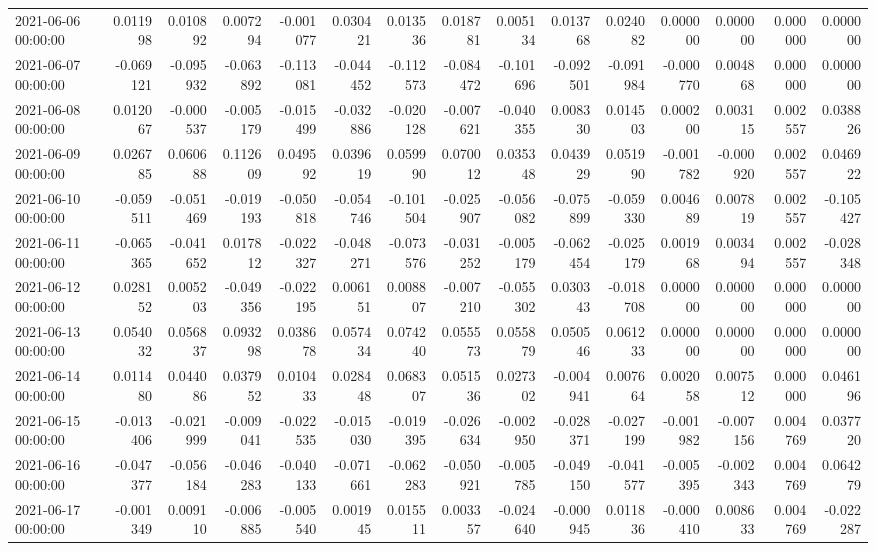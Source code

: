 \begin{tabular}{lrrrrrrrrrrrrrr}
2021-06-06 00:00:00 & 0.011998 & 0.010892 & 0.007294 & -0.001077 & 0.030421 & 0.013536 & 0.018781 & 0.005134 & 0.013768 & 0.024082 & 0.000000 & 0.000000 & 0.000000 & 0.000000 \\
2021-06-07 00:00:00 & -0.069121 & -0.095932 & -0.063892 & -0.113081 & -0.044452 & -0.112573 & -0.084472 & -0.101696 & -0.092501 & -0.091984 & -0.000770 & 0.004868 & 0.000000 & 0.000000 \\
2021-06-08 00:00:00 & 0.012067 & -0.000537 & -0.005179 & -0.015499 & -0.032886 & -0.020128 & -0.007621 & -0.040355 & 0.008330 & 0.014503 & 0.000200 & 0.003115 & 0.002557 & 0.038826 \\
2021-06-09 00:00:00 & 0.026785 & 0.060688 & 0.112609 & 0.049592 & 0.039619 & 0.059990 & 0.070012 & 0.035348 & 0.043929 & 0.051990 & -0.001782 & -0.000920 & 0.002557 & 0.046922 \\
2021-06-10 00:00:00 & -0.059511 & -0.051469 & -0.019193 & -0.050818 & -0.054746 & -0.101504 & -0.025907 & -0.056082 & -0.075899 & -0.059330 & 0.004689 & 0.007819 & 0.002557 & -0.105427 \\
2021-06-11 00:00:00 & -0.065365 & -0.041652 & 0.017812 & -0.022327 & -0.048271 & -0.073576 & -0.031252 & -0.005179 & -0.062454 & -0.025179 & 0.001968 & 0.003494 & 0.002557 & -0.028348 \\
2021-06-12 00:00:00 & 0.028152 & 0.005203 & -0.049356 & -0.022195 & 0.006151 & 0.008807 & -0.007210 & -0.055302 & 0.030343 & -0.018708 & 0.000000 & 0.000000 & 0.000000 & 0.000000 \\
2021-06-13 00:00:00 & 0.054032 & 0.056837 & 0.093298 & 0.038678 & 0.057434 & 0.074240 & 0.055573 & 0.055879 & 0.050546 & 0.061233 & 0.000000 & 0.000000 & 0.000000 & 0.000000 \\
2021-06-14 00:00:00 & 0.011480 & 0.044086 & 0.037952 & 0.010433 & 0.028448 & 0.068307 & 0.051536 & 0.027302 & -0.004941 & 0.007664 & 0.002058 & 0.007512 & 0.000000 & 0.046196 \\
2021-06-15 00:00:00 & -0.013406 & -0.021999 & -0.009041 & -0.022535 & -0.015030 & -0.019395 & -0.026634 & -0.002950 & -0.028371 & -0.027199 & -0.001982 & -0.007156 & 0.004769 & 0.037720 \\
2021-06-16 00:00:00 & -0.047377 & -0.056184 & -0.046283 & -0.040133 & -0.071661 & -0.062283 & -0.050921 & -0.005785 & -0.049150 & -0.041577 & -0.005395 & -0.002343 & 0.004769 & 0.064279 \\
2021-06-17 00:00:00 & -0.001349 & 0.009110 & -0.006885 & -0.005540 & 0.001945 & 0.015511 & 0.003357 & -0.024640 & -0.000945 & 0.011836 & -0.000410 & 0.008633 & 0.004769 & -0.022287 \\

\end{tabular}
